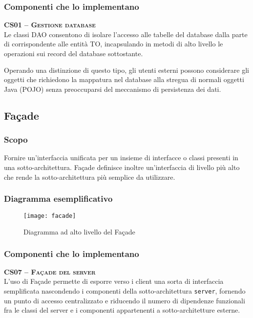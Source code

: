 \subsubsection{Componenti che lo implementano}
\begin{description}
\item{\scshape\bfseries CS01 -- Gestione database}\\
Le classi DAO consentono di isolare l'accesso alle tabelle del database dalla parte di  corrispondente alle entità TO, incapsulando in metodi di alto livello le operazioni sui record del database sottostante.

Operando una distinzione di questo tipo, gli utenti esterni possono considerare gli oggetti che richiedono la mappatura nel database alla stregua di normali oggetti Java (POJO) senza preoccuparsi del meccanismo di persistenza dei dati.
\end{description}

\subsection{Façade}

\subsubsection{Scopo}
Fornire un'interfaccia unificata per un insieme di interfacce o classi presenti in una sotto-architettura. Façade definisce inoltre un'interfaccia di livello più alto che rende la sotto-architettura più semplice da utilizzare.

\subsubsection{Diagramma esemplificativo}
\begin{figure}[H]
  \centering
  \texttt{[image: facade]}
  \caption{Diagramma ad alto livello del  Façade}\label{fig:façade}
\end{figure}

\subsubsection{Componenti che lo implementano}
\begin{description}
  \item{\scshape\bfseries CS07 -- Façade del server}\\
L'uso di Façade permette di esporre verso i client una sorta di interfaccia semplificata nascondendo i componenti della sotto-architettura \texttt{server}, fornendo un punto di accesso centralizzato e riducendo il numero di dipendenze funzionali fra le classi del server e i componenti appartenenti a sotto-architetture esterne.

\end{description}

